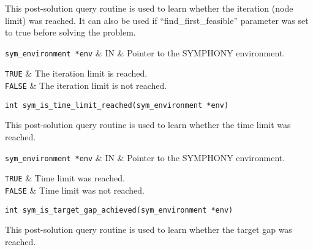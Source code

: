\bd
\describe

This post-solution query routine is used to learn whether the iteration 
(node limit) was reached. It can also be used if ``find\_first\_feasible'' 
parameter was set to true before solving the problem.

\args

{\tt sym\_environment *env} & IN & Pointer to the SYMPHONY environment.
\et

\returns

{\tt TRUE} & The iteration limit is reached. \\
{\tt FALSE} & The iteration limit is not reached.\\
\et
\ed
\vspace{1ex}


\begin{verbatim}
int sym_is_time_limit_reached(sym_environment *env)
\end{verbatim}

\bd
\describe

This post-solution query routine is used to learn whether the time limit 
was reached. 

\args

{\tt sym\_environment *env} & IN & Pointer to the SYMPHONY environment.
\et

\returns

{\tt TRUE} & Time limit was reached. \\
{\tt FALSE} & Time limit was not reached.\\
\et
\ed
\vspace{1ex}


\begin{verbatim}
int sym_is_target_gap_achieved(sym_environment *env)
\end{verbatim}

\bd
\describe

This post-solution query routine is used to learn whether the target gap was
reached. 

